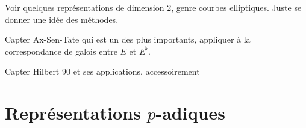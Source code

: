 \documentclass[a4paper,12pt]{article}
\theoremstyle{plain}
\theoremstyle{definition}
\theoremstyle{remark}
\begin{document}
Voir quelques représentations de dimension $2$, genre courbes 
elliptiques. Juste se donner une idée des méthodes.

Capter Ax-Sen-Tate qui est un des plus importants, appliquer à 
la correspondance de galois entre $E$ et $E^\flat$.

Capter Hilbert $90$ et ses applications, accessoirement 





\section{Représentations $p$-adiques}
\end{document}
